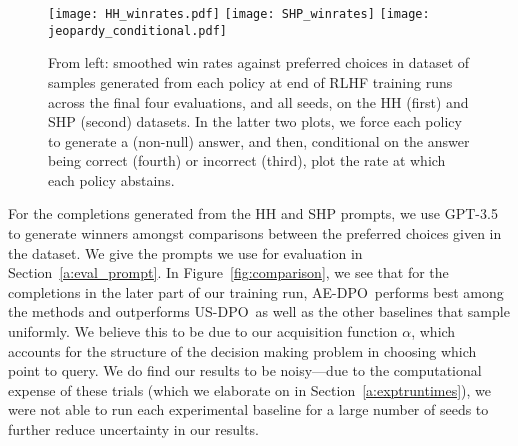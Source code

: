 \documentclass{article} \usepackage{iclr2023_conference,times}
\newcommand{\dpoae}{AE-DPO}
\newcommand{\usdpo}{US-DPO}
\newcommand{\add}[1]{#1}
\begin{document}
\begin{figure}
    \centering
    \texttt{[image: HH\_winrates.pdf]}
    \texttt{[image: SHP\_winrates]}
    \texttt{[image: jeopardy\_conditional.pdf]}
\caption{\small From left: \add{smoothed} win rates \add{against preferred choices in dataset} of samples generated from each policy at end of RLHF training runs across the final four evaluations, and all seeds, on the HH (first) and SHP (second) datasets. In the latter two plots, we force each policy to generate a (non-null) answer,
and then, conditional on the answer being correct (fourth) or incorrect (third), plot the rate at which each policy abstains.
}
    \label{fig:llm_expts}
\end{figure}

For the completions generated from the HH and SHP prompts, we use GPT-3.5 \citep{brown2020language} to generate winners amongst comparisons between the preferred choices given in the dataset. We give the prompts we use for evaluation in Section~\ref{a:eval_prompt}. In Figure~\ref{fig:comparison}, we see that for the completions in the later part of our training run, \dpoae\ performs best among the methods and outperforms \usdpo\ as well as the other baselines that sample uniformly. We believe this to be due to our acquisition function $\alpha$, which accounts for the structure of the decision making problem in choosing which point to query. We do find our results to be noisy---due to the computational expense of these trials (which we elaborate on in Section~\ref{a:exptruntimes}),
we were not able to run each experimental baseline for a large number of seeds to further reduce uncertainty in our results.
\end{document}
